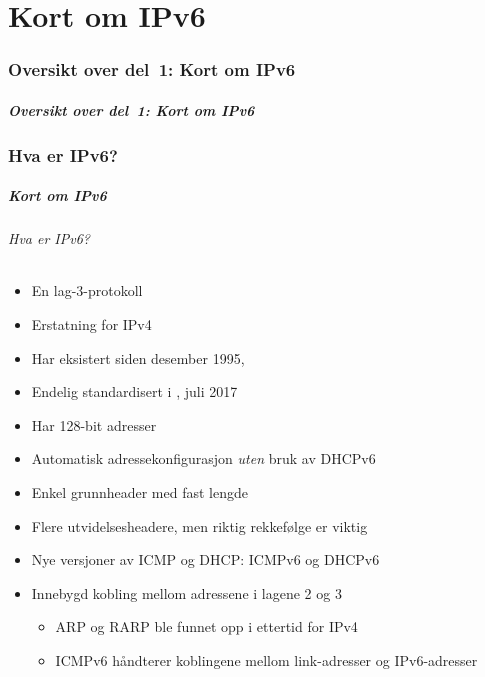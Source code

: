 \part{Kort om IPv6}

\makeatletter
{}
\makeatother

\begin{frame}
  \partpage
\end{frame}

\section*{Oversikt over del~1: Kort om IPv6}
\begin{frame}%
  \frametitle{Oversikt over del~1: Kort om IPv6}
    \tableofcontents%
\end{frame}

\section{Hva er IPv6?}
\begin{frame}%
  \frametitle{Kort om IPv6}
  \framesubtitle{Hva er IPv6?}
  \begin{itemize}%
  \item En lag-3-protokoll
  \item Erstatning for IPv4
  \item Har eksistert siden desember 1995, 
  \item Endelig standardisert i , juli 2017
  \item \alert<2>{Har 128-bit adresser}
  \item \alert<2>{Automatisk adressekonfigurasjon \textit{uten\/} bruk av DHCPv6}
  \item Enkel grunnheader med fast lengde
  \item Flere utvidelsesheadere, men riktig rekkefølge er viktig
  \item Nye versjoner av ICMP og DHCP: ICMPv6 og DHCPv6
  \item Innebygd kobling mellom adressene i lagene 2 og 3
    \begin{itemize}%
      \item ARP og RARP ble funnet opp i ettertid for IPv4
      \item ICMPv6 håndterer koblingene mellom link-adresser og IPv6-adresser
    \end{itemize}
  \end{itemize}
\end{frame}

